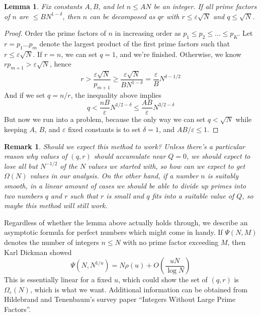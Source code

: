\documentclass{report}
\theoremstyle{plain}
\newtheorem{lemma}{Lemma}
\theoremstyle{plain}
\newtheorem*{remark}{Remark}
\begin{document}
\begin{lemma}
    Fix constants $A,B$, and let $n \leq AN$ be an integer. If all prime factors of $n$ are $\leq BN^{1-\delta}$, then $n$ can be decomposed as $qr$ with $r \leq \varepsilon \sqrt{N}$ and $q \leq \sqrt{N}$.
\end{lemma}
\begin{proof}
    Order the prime factors of $n$ in increasing order as $p_1 \leq p_2 \leq \dots \leq p_K$. Let $r = p_1 \dots p_m$ denote the largest product of the first prime factors such that $r \leq \varepsilon \sqrt{N}$. If $r = n$, we can set $q = 1$, and we're finished. Otherwise, we know $r p_{m+1} > \varepsilon \sqrt{N}$, hence
    \[ r > \frac{\varepsilon \sqrt{N}}{p_{m+1}} \geq \frac{\varepsilon \sqrt{N}}{B N^{1-\delta}} = \frac{\varepsilon}{B} N^{\delta - 1/2} \]
    And if we set $q = n/r$, the inequality above implies
    \[ q < \frac{nB}{\varepsilon} N^{1/2 - \delta} \leq \frac{AB}{\varepsilon} N^{3/2-\delta} \]
    But now we run into a problem, because the only way we can set $q < \sqrt{N}$ while keeping $A$, $B$, and $\varepsilon$ fixed constants is to set $\delta = 1$, and $AB/\varepsilon \leq 1$.
\end{proof}

\begin{remark}
    Should we expect this method to work? Unless there's a particular reason why values of $(q,r)$ should accumulate near $Q = 0$, we should expect to lose all but $N^{-1/2}$ of the $N$ values we started with, so how can we expect to get $\Omega(N)$ values in our analysis. On the other hand, if a number $n$ is suitably smooth, in a linear amount of cases we should be able to divide up primes into two numbers $q$ and $r$ such that $r$ is small and $q$ fits into a suitable value of $Q$, so maybe this method will still work.
\end{remark}

Regardless of whether the lemma above actually holds through, we describe an asymptotic formula for perfect numbers which might come in handy. If $\Psi(N,M)$ denotes the number of integers $n \leq N$ with no prime factor exceeding $M$, then Karl Dickman showed
%
\[ \Psi(N,N^{1/u}) = N \rho(u) + O \left( \frac{u N}{\log N} \right) \]
%
This is essentially linear for a fixed $u$, which could show the set of $(q,r)$ is $\Omega_\varepsilon(N)$, which is what we want. Additional information can be obtained from Hildebrand and Tenenbaum's survey paper ``Integers Without Large Prime Factors''.
\end{document}
